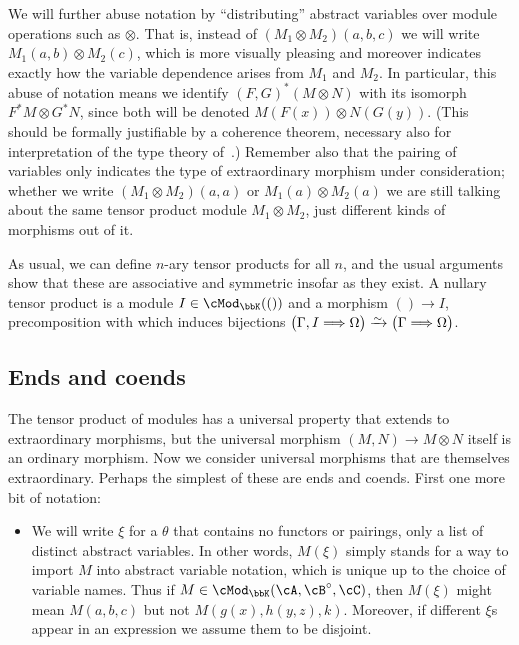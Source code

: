 \documentclass{amsart}
\newcommand{\A}{\cA}
\newcommand{\B}{\cB}
\newcommand{\C}{\cC}
\newcommand{\K}{\bbK}
\let\mod\cMod
\def\modk{\mod_\K}
\renewcommand{\o}{^{\circ}}
\let\vdash\Longrightarrow
\let\mto\vdash    %
\def\mhom#1#2{\left( #1 \vphantom{\big|}\mto #2 \right)}
\begin{document}
We will further abuse notation by ``distributing'' abstract variables over module operations such as $\otimes$.
That is, instead of $(M_1 \otimes M_2)(a,b,c)$ we will write $M_1(a,b)\otimes M_2(c)$, which is more visually pleasing and moreover indicates exactly how the variable dependence arises from $M_1$ and $M_2$.
In particular, this abuse of notation means we identify $(F,G)^*(M\otimes N)$ with its isomorph $F^*M \otimes G^*N$, since both will be denoted $M(F(x)) \otimes N(G(y))$.
(This should be formally justifiable by a coherence theorem, necessary also for interpretation of the type theory of~\cite{lnss:dirtt}.)
Remember also that the pairing of variables only indicates the type of extraordinary morphism under consideration; whether we write $(M_1 \otimes M_2)(a,a)$ or $M_1(a)\otimes M_2(a)$ we are still talking about the same tensor product module $M_1\otimes M_2$, just different kinds of morphisms out of it.

As usual, we can define $n$-ary tensor products for all $n$, and the usual arguments show that these are associative and symmetric insofar as they exist.
A nullary tensor product is a module $I\in \modk(())$ and a morphism $() \to I$, precomposition with which induces bijections $\mhom{\Gamma,I}{\Omega} \toiso \mhom\Gamma \Omega$.

\subsection{Ends and coends}
\label{sec:ends-coends}

The tensor product of modules has a universal property that extends to extraordinary morphisms, but the universal morphism $(M,N)\to M\otimes N$ itself is an ordinary morphism.
Now we consider universal morphisms that are themselves extraordinary.
Perhaps the simplest of these are ends and coends.
First one more bit of notation:

\begin{itemize}
\item We will write $\xi$ for a $\theta$ that contains no functors or pairings, only a list of distinct abstract variables.
  In other words, $M(\xi)$ simply stands for a way to import $M$ into abstract variable notation, which is unique up to the choice of variable names.
  Thus if $M\in \modk(\A,\B\o,\C)$, then $M(\xi)$ might mean $M(a,b,c)$ but not $M(g(x),h(y,z),k)$.
  Moreover, if different $\xi$s appear in an expression we assume them to be disjoint.
\end{itemize}
\end{document}
